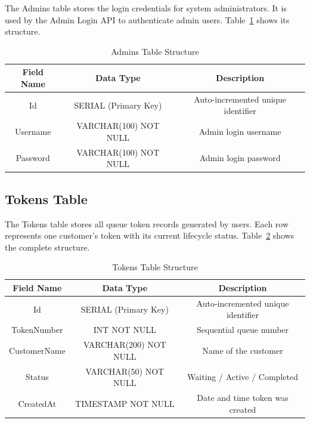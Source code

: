 The Admins table stores the login credentials for system administrators. It is used by the Admin Login API to authenticate admin users. Table~\ref{tab:admins} shows its structure.

\begin{table}[htbp]
    \centering
    \begin{tabular}{|c|c|c|}
        \hline
        \textbf{Field Name} & \textbf{Data Type} & \textbf{Description} \\
        \hline
        Id & SERIAL (Primary Key) & Auto-incremented unique identifier \\
        \hline
        Username & VARCHAR(100) NOT NULL & Admin login username \\
        \hline
        Password & VARCHAR(100) NOT NULL & Admin login password \\
        \hline
    \end{tabular}
    \caption{Admins Table Structure}
    \label{tab:admins}
\end{table}

\subsection{Tokens Table}

The Tokens table stores all queue token records generated by users. Each row represents one customer's token with its current lifecycle status. Table~\ref{tab:tokens} shows the complete structure.

\begin{table}[htbp]
    \centering
    \begin{tabular}{|c|c|c|}
        \hline
        \textbf{Field Name} & \textbf{Data Type} & \textbf{Description} \\
        \hline
        Id & SERIAL (Primary Key) & Auto-incremented unique identifier \\
        \hline
        TokenNumber & INT NOT NULL & Sequential queue number \\
        \hline
        CustomerName & VARCHAR(200) NOT NULL & Name of the customer \\
        \hline
        Status & VARCHAR(50) NOT NULL & Waiting / Active / Completed \\
        \hline
        CreatedAt & TIMESTAMP NOT NULL & Date and time token was created \\
        \hline
    \end{tabular}
    \caption{Tokens Table Structure}
    \label{tab:tokens}
\end{table}

